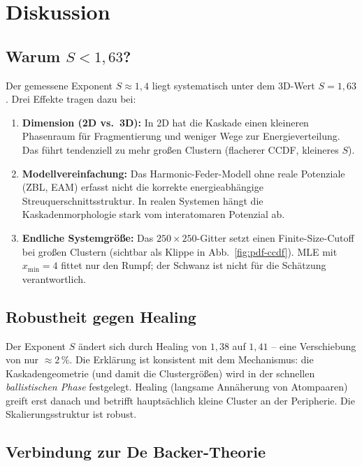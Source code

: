 \documentclass[11pt,a4paper]{article}
\begin{document}
\FloatBarrier
\section{Diskussion}
\label{sec:powerlaw-discussion}

\subsection{Warum $S < 1{,}63$?}

Der gemessene Exponent $S \approx 1{,}4$ liegt systematisch unter dem 3D-Wert
$S = 1{,}63$. Drei Effekte tragen dazu bei:
\begin{enumerate}[itemsep=2pt]
\item \textbf{Dimension (2D vs.\ 3D):}
  In 2D hat die Kaskade einen kleineren Phasenraum für Fragmentierung
  und weniger Wege zur Energieverteilung. Das führt tendenziell zu
  mehr großen Clustern (flacherer CCDF, kleineres $S$).
\item \textbf{Modellvereinfachung:}
  Das Harmonic-Feder-Modell ohne reale Potenziale (ZBL, EAM) erfasst
  nicht die korrekte energieabhängige Streuquerschnittsstruktur.
  In realen Systemen hängt die Kaskadenmorphologie stark vom
  interatomaren Potenzial ab.
\item \textbf{Endliche Systemgröße:}
  Das $250 \times 250$-Gitter setzt einen Finite-Size-Cutoff bei
  großen Clustern (sichtbar als Klippe in Abb.~\ref{fig:pdf-ccdf}).
  MLE mit $x_\text{min} = 4$ fittet nur den Rumpf; der Schwanz
  ist nicht für die Schätzung verantwortlich.
\end{enumerate}

\subsection{Robustheit gegen Healing}

Der Exponent $S$ ändert sich durch Healing von $1{,}38$ auf $1{,}41$ --
eine Verschiebung von nur $\approx 2\,\%$. Die Erklärung ist konsistent
mit dem Mechanismus: die Kaskadengeometrie (und damit die Clustergrößen)
wird in der schnellen \emph{ballistischen Phase} festgelegt. Healing
(langsame Annäherung von Atompaaren) greift erst danach und betrifft
hauptsächlich kleine Cluster an der Peripherie. Die Skalierungsstruktur
ist robust.

\subsection{Verbindung zur De Backer-Theorie}
\end{document}
